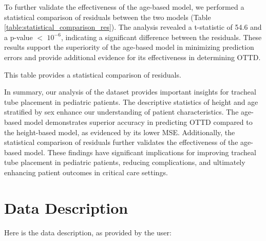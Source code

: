 \documentclass[11pt]{article}
\begin{document}
To further validate the effectiveness of the age-based model, we performed a statistical comparison of residuals between the two models (Table {}\ref{table:statistical_comparison_res}). The analysis revealed a t-statistic of 54.6 and a p-value $<$ $10^{-6}$, indicating a significant difference between the residuals. These results support the superiority of the age-based model in minimizing prediction errors and provide additional evidence for its effectiveness in determining OTTD.

\begin{table}[h]
\caption{Statistical Comparison of Residuals of the Height and Age Formula-Based Models}
\label{table:statistical_comparison_res}
\begin{threeparttable}
\renewcommand{\TPTminimum}{\linewidth}
\begin{tablenotes}
\footnotesize
\item This table provides a statistical comparison of residuals.
\end{tablenotes}
\end{threeparttable}
\end{table}


In summary, our analysis of the dataset provides important insights for tracheal tube placement in pediatric patients. The descriptive statistics of height and age stratified by sex enhance our understanding of patient characteristics. The age-based model demonstrates superior accuracy in predicting OTTD compared to the height-based model, as evidenced by its lower MSE. Additionally, the statistical comparison of residuals further validates the effectiveness of the age-based model. These findings have significant implications for improving tracheal tube placement in pediatric patients, reducing complications, and ultimately enhancing patient outcomes in critical care settings.


\clearpage
\appendix

\section{Data Description} \label{sec:data_description} Here is the data description, as provided by the user:
\end{document}
